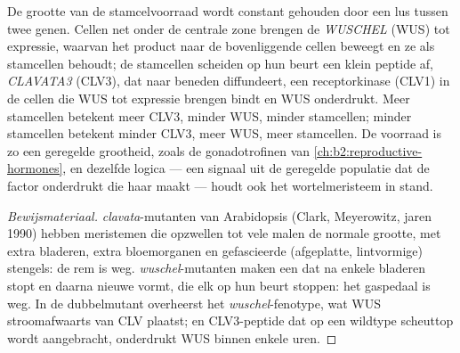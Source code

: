 \begin{proposition}\label{prop:b2:plant-meristems:wus}
De grootte van de stamcelvoorraad wordt constant gehouden door een lus
tussen twee genen. Cellen net onder de centrale zone brengen de
 \emph{WUSCHEL} (WUS) tot expressie, waarvan het product
naar de bovenliggende cellen beweegt en ze als stamcellen behoudt; de
stamcellen scheiden op hun beurt een klein peptide af, \emph{CLAVATA3}
(CLV3), dat naar beneden diffundeert, een receptorkinase (CLV1) in de cellen
die WUS tot expressie brengen bindt en WUS onderdrukt. Meer stamcellen
betekent meer CLV3, minder WUS, minder stamcellen; minder stamcellen betekent
minder CLV3, meer WUS, meer stamcellen. De voorraad is zo een geregelde
grootheid, zoals de gonadotrofinen van \cref{ch:b2:reproductive-hormones},
en dezelfde logica --- een signaal uit de geregelde populatie dat de factor
onderdrukt die haar maakt --- houdt ook het wortelmeristeem in stand.
\end{proposition}
\begin{proof}[Bewijsmateriaal]
\emph{clavata}-mutanten van Arabidopsis (Clark, Meyerowitz, jaren 1990)
hebben meristemen die opzwellen tot vele malen de normale grootte, met extra
bladeren, extra bloemorganen en gefascieerde (afgeplatte, lintvormige)
stengels: de rem is weg. \emph{wuschel}-mutanten maken een  dat na
enkele bladeren stopt en daarna nieuwe vormt, die elk op hun beurt stoppen:
het gaspedaal is weg. In de dubbelmutant overheerst het
\emph{wuschel}-fenotype, wat WUS stroomafwaarts van CLV plaatst; en
CLV3-peptide dat op een wildtype scheuttop wordt aangebracht, onderdrukt
WUS binnen enkele uren.
\end{proof}

